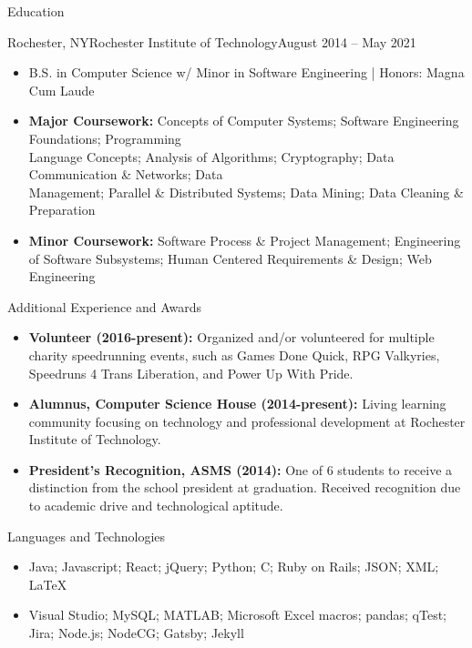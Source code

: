 \documentclass[]{mcdowellcv}
\begin{document}
	\begin{cvsection}{Education}
		\begin{cvsubsection}{Rochester, NY}{Rochester Institute of Technology}{August 2014 -- May 2021}
			\begin{itemize}
				\item B.S. in Computer Science w/ Minor in Software Engineering | Honors: Magna Cum Laude
				\item \textbf{Major Coursework:} Concepts of Computer Systems; Software Engineering Foundations; Programming \\Language Concepts; Analysis of Algorithms; Cryptography; Data Communication \& Networks; Data \\Management; Parallel \& Distributed Systems; Data Mining; Data Cleaning \& Preparation
				\item \textbf{Minor Coursework:} Software Process \& Project Management; Engineering of Software Subsystems; Human Centered Requirements \& Design; Web Engineering
			\end{itemize}
		\end{cvsubsection}
	\end{cvsection}
	
	\begin{cvsection}{Additional Experience and Awards}
		\begin{cvsubsection}{}{}{}	
			\begin{itemize}
				\item \textbf{Volunteer (2016-present):} Organized and/or volunteered for multiple charity speedrunning events, such as Games Done Quick, RPG Valkyries, Speedruns 4 Trans Liberation, and Power Up With Pride.
				\item \textbf{Alumnus, Computer Science House (2014-present):} Living learning community focusing on technology and professional development at Rochester Institute of Technology.
				\item \textbf{President's Recognition, ASMS (2014):} One of 6 students to receive a distinction from the school president at graduation. Received recognition due to academic drive and technological aptitude.
			\end{itemize}
		\end{cvsubsection}
	\end{cvsection}
	
	\begin{cvsection}{Languages and Technologies}
		\begin{cvsubsection}{}{}{}	
			\begin{itemize}
				\item Java; Javascript; React; jQuery; Python; C; Ruby on Rails; JSON; XML; LaTeX
				\item Visual Studio; MySQL; MATLAB; Microsoft Excel macros; pandas; qTest; Jira; Node.js; NodeCG; Gatsby; Jekyll
			\end{itemize}
		\end{cvsubsection}
	\end{cvsection}
	
\end{document}
